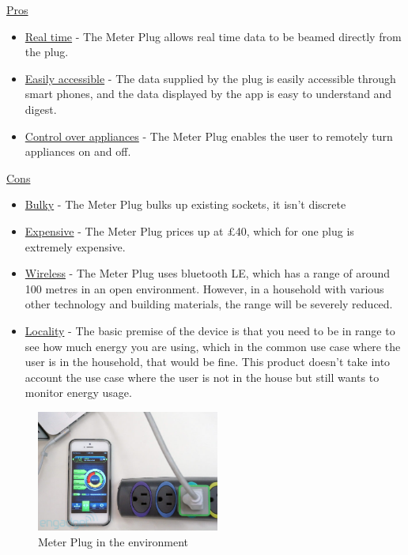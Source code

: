 \documentclass[draft,preprint,12pt,3p]{elsarticle}
\begin{document}
\begin{center}
    \underline{Pros}
    \begin{itemize}
      \item \underline{Real time} - The Meter Plug allows real time data to be beamed directly from the plug. 
      \item \underline{Easily accessible} - The data supplied by the plug is easily accessible through smart phones, and the data displayed by the app is easy to understand and digest.
      \item \underline{Control over appliances} - The Meter Plug enables the user to remotely turn appliances on and off.
    \end{itemize}
    
    \underline{Cons}
    
    \begin{itemize}
      \item \underline{Bulky} - The Meter Plug bulks up existing sockets, it isn't discrete
      \item \underline{Expensive} - The Meter Plug prices up at \pounds40, which for one plug is extremely expensive. 
      \item \underline{Wireless} - The Meter Plug uses bluetooth LE, which has a range of around 100 metres in an open environment. However, in a household with various other technology and building materials, the range will be severely reduced.
      \item \underline{Locality} - The basic premise of the device is that you need to be in range to see how much energy you are using, which in the common use case where the user is in the household, that would be fine. This product doesn't take into account the use case where the user is not in the house but still wants to monitor energy usage.
    \end{itemize}
    
\end{center}


\begin{figure}[h]
    \centering
    \includegraphics[width=6cm]{existing/meterplug}
    \caption {Meter Plug in the environment}
\end{figure}
\end{document}
